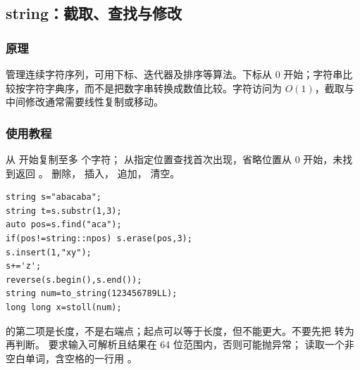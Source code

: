 \subsection{string：截取、查找与修改}
\label{stl:string}
\subsubsection*{原理}
 管理连续字符序列，可用下标、迭代器及排序等算法。下标从 0 开始；字符串比较按字符字典序，而不是把数字串转换成数值比较。字符访问为 $O(1)$，截取与中间修改通常需要线性复制或移动。
\subsubsection*{使用教程}
 从  开始复制至多  个字符； 从指定位置查找首次出现，省略位置从 0 开始，未找到返回 。 删除， 插入，\InlineCode{+=} 追加， 清空。
\begin{lstlisting}[style=mtycpp,numbers=none]
string s="abacaba";
string t=s.substr(1,3);
auto pos=s.find("aca");
if(pos!=string::npos) s.erase(pos,3);
s.insert(1,"xy");
s+='z';
reverse(s.begin(),s.end());
string num=to_string(123456789LL);
long long x=stoll(num);
\end{lstlisting}
 的第二项是长度，不是右端点；起点可以等于长度，但不能更大。不要先把  转为  再判断。 要求输入可解析且结果在 64 位范围内，否则可能抛异常； 读取一个非空白单词，含空格的一行用 。

